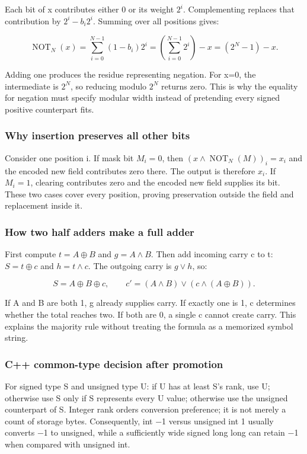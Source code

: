 Each bit of x contributes either 0 or its weight \(2^i\). Complementing replaces that contribution by \(2^i-b_i2^i\). Summing over all positions gives:

\[
\operatorname{NOT}_N(x)=\sum_{i=0}^{N-1}(1-b_i)2^i
=\left(\sum_{i=0}^{N-1}2^i\right)-x=(2^N-1)-x.
\]

Adding one produces the residue representing negation. For x=0, the intermediate is \(2^N\), so reducing modulo \(2^N\) returns zero. This is why the equality for negation must specify modular width instead of pretending every signed positive counterpart fits.

\subsubsection{Why insertion preserves all other bits}\label{why-insertion-preserves-all-other-bits}

Consider one position i. If mask bit \(M_i=0\), then \((x\land\operatorname{NOT}_N(M))_i=x_i\) and the encoded new field contributes zero there. The output is therefore \(x_i\). If \(M_i=1\), clearing contributes zero and the encoded new field supplies its bit. These two cases cover every position, proving preservation outside the field and replacement inside it.

\subsubsection{How two half adders make a full adder}\label{how-two-half-adders-make-a-full-adder}

First compute \(t=A\oplus B\) and \(g=A\land B\). Then add incoming carry c to t: \(S=t\oplus c\) and \(h=t\land c\). The outgoing carry is \(g\lor h\), so:

\[
S=A\oplus B\oplus c,\qquad c'=(A\land B)\lor(c\land(A\oplus B)).
\]

If A and B are both 1, g already supplies carry. If exactly one is 1, c determines whether the total reaches two. If both are 0, a single c cannot create carry. This explains the majority rule without treating the formula as a memorized symbol string.

\subsubsection{C++ common-type decision after promotion}\label{c-common-type-decision-after-promotion}

For signed type S and unsigned type U: if U has at least S's rank, use U; otherwise use S only if S represents every U value; otherwise use the unsigned counterpart of S. Integer rank orders conversion preference; it is not merely a count of storage bytes. Consequently, int −1 versus unsigned int 1 usually converts −1 to unsigned, while a sufficiently wide signed long long can retain −1 when compared with unsigned int.

